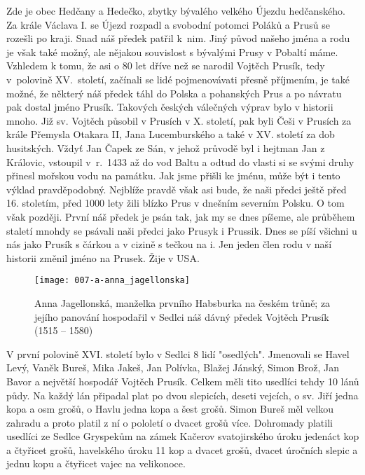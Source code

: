 \documentclass[../dejiny-rodu-prusiku.tex]{subfiles}
\begin{document}
Zde je obec Hedčany a Hedečko, zbytky bývalého velkého Újezdu hedčanského. Za krále Václava I. se Újezd rozpadl a svobodní potomci Poláků a Prusů se rozešli po kraji. Snad náš předek patřil k~nim. Jiný původ našeho jména a rodu je však také možný, ale nějakou souvislost s bývalý­mi Prusy v Pobaltí máme. Vzhledem k tomu, že asi o 80 let dříve než se narodil Vojtěch Prusík, tedy v~polovině XV.~století, začínali se lidé pojmenovávati přesně příjmením, je také možné, že některý náš předek táhl do Polska a pohanských Prus a po návratu pak dostal jméno Prusík. Takových českých válečných výprav bylo v historii mnoho. Již sv. Vojtěch působil v Prusích v X. století, pak byli Češi v Prusích za krále Přemysla Otakara II, Jana Lucemburského a také v XV. století za dob husitských. Vždyť Jan Čapek ze Sán, v jehož průvodě byl i hejtman Jan z Královic, vstoupil v~r.~1433 až do vod Baltu a odtud do vlasti si se svými druhy přinesl mořskou vodu na památ­ku. Jak jsme přišli ke jménu, může být i tento výklad pravděpodobný. Nejblíže pravdě však asi bude, že naši před­ci ještě před 16. stoletím, před 1000 lety žili blízko Prus v dnešním severním Polsku. O tom však později. První náš předek je psán tak, jak my se dnes píšeme, ale průběhem staletí mnohdy se psávali naši předci jako Prusyk i Prussik. Dnes se píší všichni u nás jako Prusík s čárkou a v cizině s tečkou na i. Jen jeden člen rodu v naší historii změnil jméno na Prusek. Žije v USA.

\begin{figure}
\centering
\texttt{[image: 007-a-anna\_jagellonska]}
\caption{Anna Jagellonská, manželka prvního Habsburka na českém trůně; za jejího panování hospodařil v Sedlci  náš dávný předek Vojtěch Prusík (1515 – 1580)}
\label{fig: 007-a-anna_jagellonska}
\end{figure}


V první polovině XVI. století bylo v Sedlci 8 lidí "osedlých". Jmenovali se Havel Levý, Vaněk Bureš, Mika Jakeš, Jan Polívka, Blažej Jánský, Simon Brož, Jan Bavor a největší hospodář Vojtěch Prusík. Celkem měli tito usedlíci tehdy 10 lánů půdy. Na každý lán připadal plat po dvou slepicích, deseti vejcích, o sv. Jiří jedna ko­pa a osm grošů, o Havlu jedna kopa a šest grošů. Simon Bureš měl velkou zahradu a proto platil z ní o pololetí o dvacet grošů více. Dohromady platili usedlíci ze Sedl­ce Gryspekům na zámek Kačerov svatojirského úroku jedenáct kop a čtyřicet grošů, havelského úroku 11 kop a dvacet grošů, dvacet úročních slepic a jednu kopu a čtyřicet vajec na velikonoce.
\end{document}
